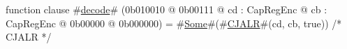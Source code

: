 function clause #\hyperref[zdecode]{decode}# (0b010010 @ 0b00111 @ cd : CapRegEnc @ cb : CapRegEnc @ 0b00000 @ 0b000000) = #\hyperref[zSome]{Some}#(#\hyperref[zCJALR]{CJALR}#(cd, cb, true)) /* CJALR */
